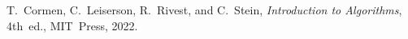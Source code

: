 \begin{thebibliography}{9}
 T.~Cormen, C.~Leiserson, R.~Rivest, and C.~Stein, \emph{Introduction to Algorithms}, 4th~ed., MIT Press, 2022.
\end{thebibliography}


